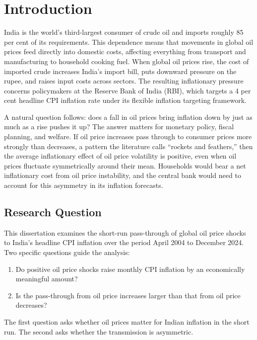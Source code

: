 \chapter{Introduction}
\label{ch:introduction}

India is the world's third-largest consumer of crude oil and imports roughly 85 per cent of its requirements. This dependence means that movements in global oil prices feed directly into domestic costs, affecting everything from transport and manufacturing to household cooking fuel. When global oil prices rise, the cost of imported crude increases India's import bill, puts downward pressure on the rupee, and raises input costs across sectors. The resulting inflationary pressure concerns policymakers at the Reserve Bank of India (RBI), which targets a 4 per cent headline CPI inflation rate under its flexible inflation targeting framework.

A natural question follows: does a fall in oil prices bring inflation down by just as much as a rise pushes it up? The answer matters for monetary policy, fiscal planning, and welfare. If oil price increases pass through to consumer prices more strongly than decreases, a pattern the literature calls ``rockets and feathers,'' then the average inflationary effect of oil price volatility is positive, even when oil prices fluctuate symmetrically around their mean. Households would bear a net inflationary cost from oil price instability, and the central bank would need to account for this asymmetry in its inflation forecasts.

\section{Research Question}

This dissertation examines the short-run pass-through of global oil price shocks to India's headline CPI inflation over the period April 2004 to December 2024. Two specific questions guide the analysis:

\begin{enumerate}[label=(\roman*)]
\item Do positive oil price shocks raise monthly CPI inflation by an economically meaningful amount?
\item Is the pass-through from oil price increases larger than that from oil price decreases?
\end{enumerate}

The first question asks whether oil prices matter for Indian inflation in the short run. The second asks whether the transmission is asymmetric.

